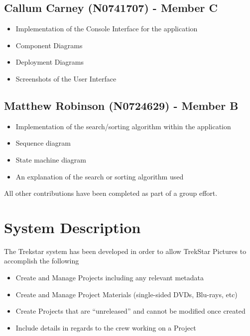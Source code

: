 \documentclass[
  english,
  a4paper,
,tablecaptionabove
]{scrartcl}
\providecommand{\tightlist}{%
  \setlength{\itemsep}{0pt}\setlength{\parskip}{0pt}}
\begin{document}
\hypertarget{callum-carney-n0741707---member-c}{%
\subsection{Callum Carney (N0741707) - Member
C}\label{callum-carney-n0741707---member-c}}

\begin{itemize}
\tightlist
\item
  Implementation of the Console Interface for the application
\item
  Component Diagrams
\item
  Deployment Diagrams
\item
  Screenshots of the User Interface
\end{itemize}

\hypertarget{matthew-robinson-n0724629---member-b}{%
\subsection{Matthew Robinson (N0724629) - Member
B}\label{matthew-robinson-n0724629---member-b}}

\begin{itemize}
\tightlist
\item
  Implementation of the search/sorting algorithm within the application
\item
  Sequence diagram
\item
  State machine diagram
\item
  An explanation of the search or sorting algorithm used
\end{itemize}

All other contributions have been completed as part of a group effort.

\newpage

\hypertarget{system-description}{%
\section{System Description}\label{system-description}}

The Trekstar system has been developed in order to allow TrekStar
Pictures to accomplish the following

\begin{itemize}
\tightlist
\item
  Create and Manage Projects including any relevant metadata
\item
  Create and Manage Project Materials (single-sided DVDs, Blu-rays, etc)
\item
  Create Projects that are \enquote{unreleased} and cannot be modified
  once created
\item
  Include details in regards to the crew working on a Project
\end{itemize}
\end{document}
